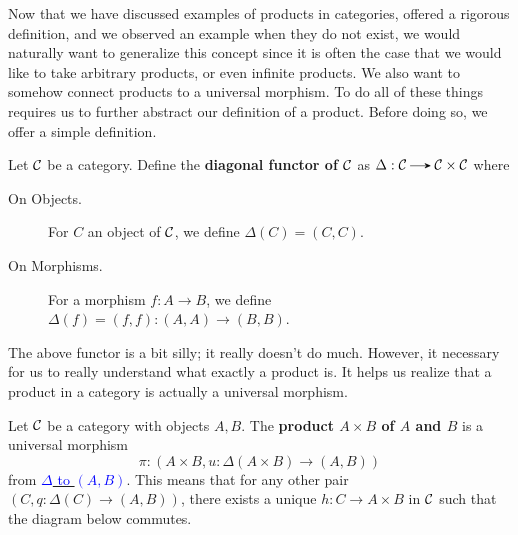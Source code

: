 Now that we have discussed examples of products in categories, offered a rigorous definition, 
and we observed an example when they do not exist, we would naturally want to generalize 
this concept since it is often the case that we would like to take arbitrary products, or even 
infinite products. We also want to somehow connect products to a universal morphism. To do all 
of these things requires us to further abstract our definition of a product. 
Before doing so, we offer a simple definition.

\begin{definition}
    Let $\mathcal{C}$ be a category.
    Define the \textbf{diagonal functor of $\mathcal{C}$} as 
    $\Delta: \cc \to \cc \times \cc$ where 
    \begin{description}
        \item[On Objects.] For $C$ an object of $\mathcal{C}$, we define $\Delta(C) = (C, C)$.
        \item[On Morphisms.] For a morphism $f: A \to B$, we define
        $\Delta(f) = (f, f): (A, A) \to (B, B)$.
    \end{description}
\end{definition}

The above functor is a bit silly; it really doesn't do much. However, it necessary for us 
to really understand what exactly a product is. It helps us realize that a product in 
a category is actually a universal morphism. 

\begin{definition}
    Let $\mathcal{C}$ be a category with objects $A, B$. The \textbf{product $A \times B$ of $A$ and $B$}
    is a universal morphism 
    \[
        \pi: (A \times B, u: \Delta(A\times B) \to (A, B))  
    \]
    from \hyperref[definition:universal_morphism_from_F_to_D]{\textcolor{blue}{$\Delta$ to $(A, B)$}}. This means that for any
    other pair $(C, q: \Delta(C) \to (A, B))$, there exists a unique 
    $h: C \to A \times B$ in $\mathcal{C}$ such that the diagram below commutes. 
    \begin{center}
    \end{center}
\end{definition}

